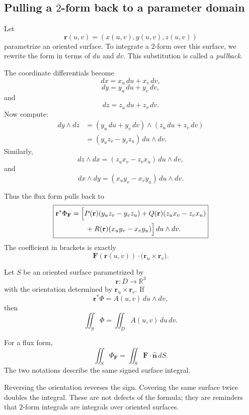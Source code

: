 \subsection{Pulling a \(2\)-form back to a parameter domain}

Let
\[
    \mathbf r(u,v)=(x(u,v),y(u,v),z(u,v))
\]
parametrize an oriented surface.  To integrate a \(2\)-form over this surface, we rewrite
the form in terms of \(du\) and \(dv\).  This substitution is called a \emph{pullback}.

The coordinate differentials become
\[
    dx=x_u\,du+x_v\,dv,
\]
\[
    dy=y_u\,du+y_v\,dv,
\]
and
\[
    dz=z_u\,du+z_v\,dv.
\]
Now compute:
\[
\begin{aligned}
    dy\wedge dz
    &=
    (y_u\,du+y_v\,dv)\wedge(z_u\,du+z_v\,dv)\\
    &=
    (y_u z_v-y_v z_u)\,du\wedge dv.
\end{aligned}
\]
Similarly,
\[
    dz\wedge dx
    =
    (z_u x_v-z_v x_u)\,du\wedge dv,
\]
and
\[
    dx\wedge dy
    =
    (x_u y_v-x_v y_u)\,du\wedge dv.
\]

Thus the flux form pulls back to
\[
\boxed{
\begin{aligned}
    \mathbf r^*\Phi_{\mathbf F}
    &=
    \Bigl[
    P(\mathbf r)(y_u z_v-y_v z_u)
    +
    Q(\mathbf r)(z_u x_v-z_v x_u)\\
    &\qquad
    +
    R(\mathbf r)(x_u y_v-x_v y_u)
    \Bigr]\,du\wedge dv.
\end{aligned}
}
\]
The coefficient in brackets is exactly
\[
    \mathbf F(\mathbf r(u,v))\cdot
    \bigl(\mathbf r_u\times\mathbf r_v\bigr).
\]

\begin{definition}
Let \(S\) be an oriented surface parametrized by
\[
    \mathbf r:D\to\mathbb R^3
\]
with the orientation determined by \(\mathbf r_u\times\mathbf r_v\).  If
\[
    \mathbf r^*\Phi=A(u,v)\,du\wedge dv,
\]
then
\[
\boxed{
    \iint_S \Phi
    =
    \iint_D A(u,v)\,du\,dv.
}
\]
\end{definition}

For a flux form,
\[
\boxed{
    \iint_S \Phi_{\mathbf F}
    =
    \iint_S \mathbf F\cdot\widehat{\mathbf n}\,dS.
}
\]
The two notations describe the same signed surface integral.

Reversing the orientation reverses the sign.  Covering the same surface twice doubles
the integral.  These are not defects of the formula; they are reminders that \(2\)-form
integrals are integrals over oriented surfaces.

